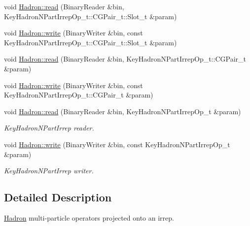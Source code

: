 \begin{DoxyCompactItemize}
void \mbox{\hyperlink{namespaceHadron_ae19da1a7e40c864440841a389b468c8d}{Hadron\+::read}} (Binary\+Reader \&bin, Key\+Hadron\+N\+Part\+Irrep\+Op\+\_\+t\+::\+C\+G\+Pair\+\_\+t\+::\+Slot\+\_\+t \&param)
\item 
void \mbox{\hyperlink{namespaceHadron_a4beaf6ce4a67fc85ae046f257141250e}{Hadron\+::write}} (Binary\+Writer \&bin, const Key\+Hadron\+N\+Part\+Irrep\+Op\+\_\+t\+::\+C\+G\+Pair\+\_\+t\+::\+Slot\+\_\+t \&param)
\item 
void \mbox{\hyperlink{namespaceHadron_a0567f3fb8f2db68b0a93251138c13a62}{Hadron\+::read}} (Binary\+Reader \&bin, Key\+Hadron\+N\+Part\+Irrep\+Op\+\_\+t\+::\+C\+G\+Pair\+\_\+t \&param)
\item 
void \mbox{\hyperlink{namespaceHadron_aa05ac649ec39cb98483ab55274129758}{Hadron\+::write}} (Binary\+Writer \&bin, const Key\+Hadron\+N\+Part\+Irrep\+Op\+\_\+t\+::\+C\+G\+Pair\+\_\+t \&param)
\item 
void \mbox{\hyperlink{namespaceHadron_a205a666e574892fd5fc22e723a24399e}{Hadron\+::read}} (Binary\+Reader \&bin, Key\+Hadron\+N\+Part\+Irrep\+Op\+\_\+t \&param)
\begin{DoxyCompactList}\small\item\em Key\+Hadron\+N\+Part\+Irrep reader. \end{DoxyCompactList}\item 
void \mbox{\hyperlink{namespaceHadron_aa056cb1973613af20ddde740db299944}{Hadron\+::write}} (Binary\+Writer \&bin, const Key\+Hadron\+N\+Part\+Irrep\+Op\+\_\+t \&param)
\begin{DoxyCompactList}\small\item\em Key\+Hadron\+N\+Part\+Irrep writer. \end{DoxyCompactList}\end{DoxyCompactItemize}


\subsection{Detailed Description}
\mbox{\hyperlink{namespaceHadron}{Hadron}} multi-\/particle operators projected onto an irrep. 

